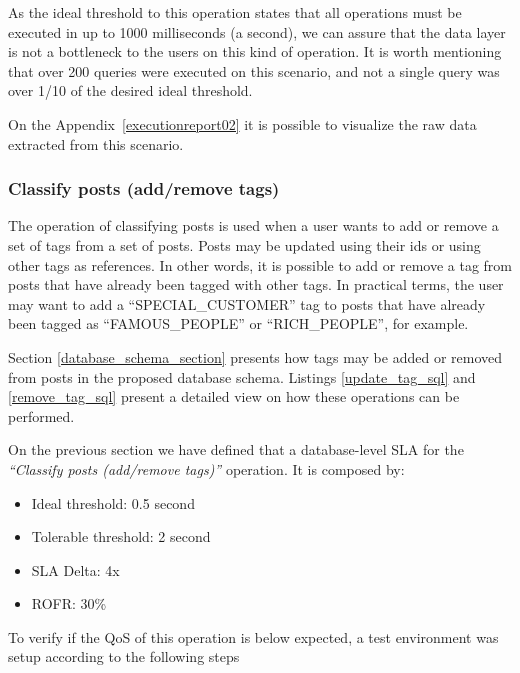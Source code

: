 As the ideal threshold to this operation states that all operations must be executed in up to 1000 milliseconds (a second), we can assure that the data layer is not a bottleneck to the users on this kind of operation. It is worth mentioning that over 200 queries were executed on this scenario, and not a single query was over 1/10 of the desired ideal threshold.

On the Appendix~\ref{executionreport02} it is possible to visualize the raw data extracted from this scenario. 

\clearpage
\subsubsection{Classify posts (add/remove tags)}

The operation of classifying posts is used when a user wants to add or remove a set of tags from a set of posts. Posts may be updated using their ids or using other tags as references. In other words, it is possible to add or remove a tag from posts that have already been tagged with other tags. In practical terms, the user may want to add a ``SPECIAL\_CUSTOMER'' tag to posts that have already been tagged as ``FAMOUS\_PEOPLE'' or ``RICH\_PEOPLE'', for example. 

Section \ref{database_schema_section} presents how tags may be added or removed from posts in the proposed database schema. Listings \ref{update_tag_sql} and \ref{remove_tag_sql} present a detailed view on how these operations can be performed. 

On the previous section we have defined that a database-level SLA for the \textit{``Classify posts (add/remove tags)''} operation. It is composed by: 

\begin{itemize}
	\item{Ideal threshold: 0.5 second}
	\item{Tolerable threshold: 2 second}
	\item{SLA Delta: 4x}
	\item{ROFR: 30\%}
\end{itemize}

To verify if the QoS of this operation is below expected, a test environment was setup according to the following steps

